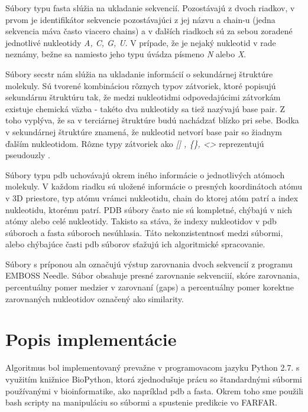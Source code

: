 \indent Súbory typu fasta slúžia na ukladanie sekvencií. Pozostávajú z dvoch riadkov, v prvom je identifikátor sekvencie pozostávajúci z jej názvu a chain-u (jedna sekvencia máva  často viacero chains) a v ďalších riadkoch sú za sebou zoradené jednotlivé nukleotidy \textit{A, C, G, U}. V prípade, že je nejaký nukleotid v rade neznámy, bežne sa namiesto jeho typu úvádza písmeno \textit{N} alebo \textit{X}.


 \indent Súbory secstr nám slúžia na ukladanie informácií o sekundárnej štruktúre molekuly. Sú tvorené kombináciou rôznych typov zátvoriek, ktoré popisujú sekundárnu štruktúru tak, že medzi nukleotidmi odpovedajúcimi zátvorkám existuje chemická väzba - takéto dva nukleotidy sa tiež nazývajú base pair. Z toho vyplýva, že sa v terciárnej štruktúre budú nachádzať blízko pri sebe. Bodka v sekundárnej štruktúre znamená, že nukleotid netvorí base pair so žiadnym ďalším nukleotidom. Rôzne typy zátvoriek  ako \textit{[] , \{\}, <>} reprezentujú pseudouzly \cite{dbnotation}.


\indent Súbory typu pdb uchovávajú okrem iného informácie o jednotlivých atómoch molekuly. V každom riadku sú uložené informácie o presných koordinátoch atómu v 3D priestore, typ atómu vrámci nukleotidu, chain do ktorej atóm patrí a index nukleotidu, ktorému patrí. PDB súbory často nie sú kompletné, chýbajú v nich atómy alebo celé nukleotidy. Takisto sa stáva, že indexy nukleotidov v pdb súboroch a fasta súboroch nesúhlasia. Táto nekonzistentnosť medzi súbormi, alebo chýbajúce časti pdb súborov sťažujú ich algoritmické spracovanie.


\indent Súbory s príponou aln označujú výstup zarovnania dvoch sekvencií z programu EMBOSS Needle. Súbor obsahuje presné zarovnanie sekvenciií, skóre zarovnania, percentuálny pomer medzier v zarovnaní (gaps) a percentuálny pomer korektne zarovnaných nukleotidov označený ako similarity. 


\section{Popis implementácie}
Algoritmus bol implementovaný prevažne v programovacom jazyku Python 2.7. s využitím knižnice BioPython, ktorá zjednodušuje prácu so štandardnými súbormi používanými v bioinformatike, ako napríklad pdb a fasta. Okrem toho sme použili bash scripty na manipuláciu so súbormi a spustenie predikcie vo FARFAR.


